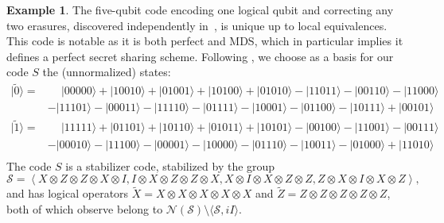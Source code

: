 \documentclass[11pt]{amsart}
\theoremstyle{definition}
\newtheorem{example}[thm]{Example}
\theoremstyle{definition}
\theoremstyle{definition}
\newcommand{\1}{\mathbb{I}}
\def\ket#1{| #1 \rangle}
\begin{document}
\begin{example}
The five-qubit code encoding one logical qubit and correcting any two erasures, discovered independently in~\cite{PhysRevLett.77.198,PhysRevA.54.3824}, is unique up to local equivalences. This code is notable as it is both perfect and MDS, which in particular implies it defines a perfect secret sharing scheme. Following \cite{gottesman1996class,gottesman1997stabilizer}, we choose as a basis for our code $S$ the (unnormalized) states:
\begin{align*}
    \ket{\widetilde{0}} = & \quad\:\ket{00000} + \ket{10010} + \ket{01001} + \ket{10100} + \ket{01010} - \ket{11011} - \ket{00110} - \ket{11000} \\
    & -\ket{11101} - \ket{00011} - \ket{11110} - \ket{01111} - \ket{10001} - \ket{01100} - \ket{10111} + \ket{00101} \\
    \ket{\widetilde{1}} = & \quad\:\ket{11111} + \ket{01101} + \ket{10110} + \ket{01011} + \ket{10101} - \ket{00100} - \ket{11001} - \ket{00111} \\
    & -\ket{00010} - \ket{11100} - \ket{00001} - \ket{10000} - \ket{01110} - \ket{10011} - \ket{01000} + \ket{11010} \\
\end{align*}
The code $S$ is a stabilizer code, stabilized by the group 
\begin{equation*}
  \mathcal S =  \left\langle X\otimes Z\otimes Z\otimes X\otimes I, I\otimes X\otimes Z\otimes Z\otimes X, X\otimes I\otimes X\otimes Z\otimes Z, Z\otimes X\otimes I\otimes X\otimes Z\right\rangle,
\end{equation*}
and has logical operators $\widetilde{X}=X\otimes X\otimes X\otimes X\otimes X$ and $\widetilde{Z}=Z\otimes Z\otimes Z\otimes Z\otimes Z$, both of which observe belong to $\mathcal N(\mathcal S) \setminus \langle \mathcal S, iI \rangle$.


\end{example}
\end{document}

